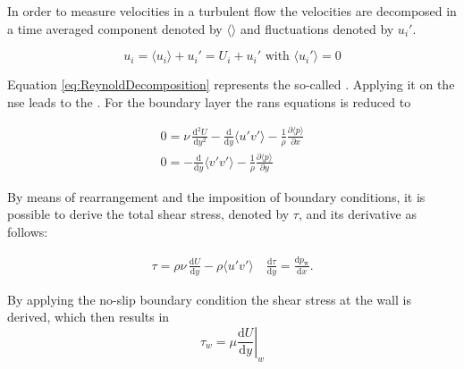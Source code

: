 In order to measure velocities in a turbulent flow the velocities are decomposed in a time averaged component denoted by $\langle \rangle$ and fluctuations denoted by  $u_i'$. 

\begin{equation}
	\label{eq:ReynoldDecomposition}
    u_i = \langle u_i \rangle + u_i' = U_i + u_i' \text{ with } \langle u_i'
\rangle = 0\end{equation}

Equation \ref{eq:ReynoldDecomposition} represents the so-called .
Applying it on the \acrshort{nse} leads to the \citep{reynolds_iv_1895}. 
For the boundary layer the \acrshort{rans} equations is reduced to 

\begin{gather}
    0 = \nu\,\frac{\mathrm{d}^2 U}{\mathrm{d}y^2} - \frac{\mathrm{d}}{\mathrm{d}y}\langle u'v'\rangle - \frac{1}{\rho}\frac{\partial \langle p\rangle}{\partial x} \\
    0 = -\frac{\mathrm{d}}{\mathrm{d}y}\langle v'v'\rangle - \frac{1}{\rho}\frac{\partial \langle p\rangle}{\partial y} 
\end{gather}

By means of rearrangement and the imposition of boundary conditions, it is possible to derive the total shear stress, denoted by $\tau$, and its derivative as follows:

\begin{gather}
    \tau = \rho\nu\,\frac{\mathrm{d} U}{\mathrm{d}y} - \rho\langle u'v'\rangle \quad
    \frac{\mathrm{d}\tau}{\mathrm{d}y} = \frac{\mathrm{d}p_{\mathrm{w}}}{\mathrm{d}x}.
\end{gather}


By applying  the no-slip boundary condition the shear stress at the wall is derived, which then results in
\begin{equation}
    \tau_w = \mu \left. \frac{\mathrm{d}U}{\mathrm{d}y} \right|_w 
\end{equation}




